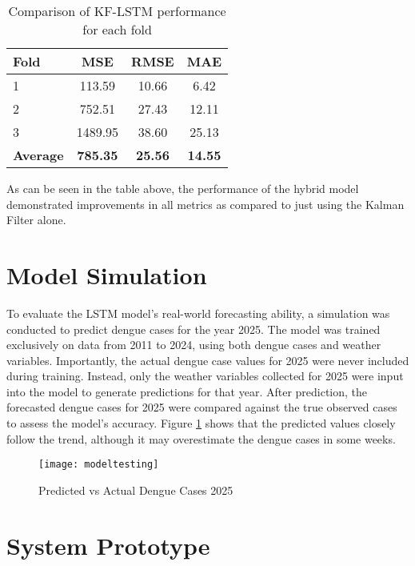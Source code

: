\begin{table}[h!]
	\centering
	\begin{tabular}{|l|c|c|c|}
		\hline
		\textbf{Fold} & \textbf{MSE} & \textbf{RMSE} & \textbf{MAE} \\
		\hline
		1 & 113.59  & 10.66 & 6.42 \\
		2 & 752.51 & 27.43 & 12.11 \\
		3 & 1489.95  & 38.60 & 25.13 \\
		\hline
		\textbf{Average} & \textbf{785.35} & \textbf{25.56} & \textbf{14.55} \\
		\hline
	\end{tabular}
	\caption{Comparison of KF-LSTM performance for each fold}
	\label{tab:tcsv_kflstm}
\end{table}

As can be seen in the table above, the performance of the hybrid model demonstrated improvements in all metrics as compared to just using the Kalman Filter alone.

\section{Model Simulation}
To evaluate the LSTM model's real-world forecasting ability, a simulation was conducted to predict dengue cases for the year 2025. The model was trained exclusively on data from 2011 to 2024, using both dengue cases and weather variables. Importantly, the actual dengue case values for 2025 were never included during training. Instead, only the weather variables collected for 2025 were input into the model to generate predictions for that year. After prediction, the forecasted dengue cases for 2025 were compared against the true observed cases to assess the model’s accuracy. Figure \ref{fig:modeltesting} shows that the predicted values closely follow the trend, although it may overestimate the dengue cases in some weeks. 

\begin{figure}[H]
	\centering
	\texttt{[image: modeltesting]}
	\caption{Predicted vs Actual Dengue Cases 2025}
	\label{fig:modeltesting}
\end{figure}

\section{System Prototype}

